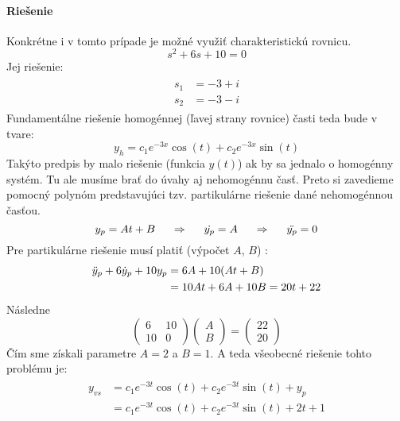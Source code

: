 \documentclass[a4paper, 10pt, ]{article}
\begin{document}
\paragraph{Riešenie}

Konkrétne i v tomto prípade je možné využiť charakteristickú rovnicu.
\begin{equation}
    s^{2} + 6s + 10 = 0  
\end{equation}
Jej riešenie:
\begin{align}
    \begin{split}
        s_1 &= -3 + i \\
        s_2 &= -3 - i 
    \end{split}
\end{align}
Fundamentálne riešenie homogénnej (ľavej strany rovnice) časti teda bude v tvare:
\begin{equation}
    y_{h} = c_1 e^{-3x}\cos{(t)} + c_2 e^{-3x}\sin{(t)}
\end{equation}
Takýto predpis by malo riešenie (funkcia $y(t)$) ak by sa jednalo o homogénny systém. Tu ale musíme brať do úvahy aj nehomogénnu časť. Preto si zavedieme pomocný polynóm predstavujúci tzv. partikulárne riešenie dané nehomogénnou časťou.
\begin{equation}
    y_{p} = At + B \hspace{0.5cm} \Rightarrow \hspace{0.5cm} \Dot{y_{p}} = A \hspace{0.5cm} \Rightarrow \hspace{0.5cm} \Ddot{y_{p}} = 0
\end{equation}
Pre partikulárne riešenie musí platiť (výpočet $A$, $B$) :
\begin{align}
    \begin{split}
        \Ddot{y}_{p} + 6\Dot{y}_{p} + 10 y_{p} &= 6A + 10(At + B) \\
        &=  10At + 6A + 10B  =  20t + 22
    \end{split}
\end{align}
Následne
\begin{equation}
    \begin{pmatrix}
    6 & 10 \\
    10 & 0
    \end{pmatrix}
    \begin{pmatrix}
    A \\
    B
    \end{pmatrix}
    =
    \begin{pmatrix}
    22 \\
    20
    \end{pmatrix}
\end{equation}
Čím sme získali parametre $A=2$ a $B=1$. A teda všeobecné riešenie tohto problému je:
\begin{align}
    \begin{split}
        y_{vs} &= c_1 e^{-3t}\cos{(t)} + c_2 e^{-3t}\sin{(t)} + y_{p} \\
        &= c_1 e^{-3t}\cos{(t)} + c_2 e^{-3t}\sin{(t)} + 2t + 1
    \end{split}
    \end{align}
\end{document}
